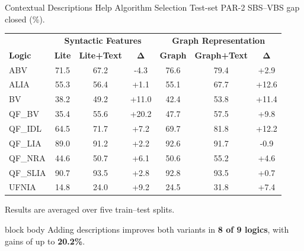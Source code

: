 \documentclass[aspectratio=169,11pt]{beamer}
\begin{document}
\begin{frame}{Contextual Descriptions Help Algorithm Selection}
  \centering
  \scriptsize
  Test-set PAR-2 SBS--VBS gap closed (\%).

  \vspace{0.45em}
  \renewcommand{\arraystretch}{1.18}
  \begin{tabular}{l ccc ccc}
    & \multicolumn{3}{c}{\textbf{Syntactic Features}}
    & \multicolumn{3}{c}{\textbf{Graph Representation}}\\
    \textbf{Logic}
      & \textbf{Lite} & \textbf{Lite+Text} & \(\boldsymbol{\Delta}\)
      & \textbf{Graph} & \textbf{Graph+Text} & \(\boldsymbol{\Delta}\)\\ \hline
    ABV      & 71.5 & 67.2 & \textcolor{mutedtext}{-4.3}
             & 76.6 & \textcolor{winnerblue}{79.4} & \textcolor{vbsorange!75!black}{+2.9}\\
    ALIA     & 55.3 & 56.4 & \textcolor{vbsorange!75!black}{+1.1}
             & 55.1 & \textcolor{winnerblue}{67.7} & \textcolor{vbsorange!75!black}{+12.6}\\
    BV       & 38.2 & 49.2 & \textcolor{vbsorange!75!black}{+11.0}
             & 42.4 & \textcolor{winnerblue}{53.8} & \textcolor{vbsorange!75!black}{+11.4}\\
    QF\_BV   & 35.4 & 55.6 & \textcolor{vbsorange!75!black}{+20.2}
             & 47.7 & \textcolor{winnerblue}{57.5} & \textcolor{vbsorange!75!black}{+9.8}\\
    QF\_IDL  & 64.5 & 71.7 & \textcolor{vbsorange!75!black}{+7.2}
             & 69.7 & \textcolor{winnerblue}{81.8} & \textcolor{vbsorange!75!black}{+12.2}\\
    QF\_LIA  & 89.0 & 91.2 & \textcolor{vbsorange!75!black}{+2.2}
             & \textcolor{winnerblue}{92.6} & 91.7 & \textcolor{mutedtext}{-0.9}\\
    QF\_NRA  & 44.6 & 50.7 & \textcolor{vbsorange!75!black}{+6.1}
             & 50.6 & \textcolor{winnerblue}{55.2} & \textcolor{vbsorange!75!black}{+4.6}\\
    QF\_SLIA & 90.7 & \textcolor{winnerblue}{93.5} & \textcolor{vbsorange!75!black}{+2.8}
             & 92.8 & \textcolor{winnerblue}{93.5} & \textcolor{vbsorange!75!black}{+0.7}\\
    UFNIA    & 14.8 & 24.0 & \textcolor{vbsorange!75!black}{+9.2}
             & 24.5 & \textcolor{winnerblue}{31.8} & \textcolor{vbsorange!75!black}{+7.4}
  \end{tabular}

  \vspace{0.3em}
  \tiny
  Results are averaged over five train--test splits.

  \vfill
  \begin{beamercolorbox}[rounded=true,sep=0.5em,center]{block body}
    \small
    Adding descriptions improves both variants in \textbf{8 of 9 logics},
    with gains of up to \textbf{20.2\%}.
  \end{beamercolorbox}
\end{frame}
\end{document}
